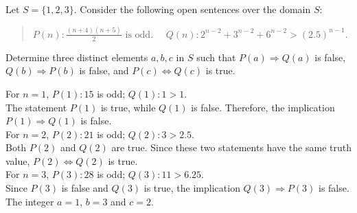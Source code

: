 \documentclass[12pt]{article}
\newenvironment{problem}[2][Problem]{\begin{trivlist}
		\item[\hskip \labelsep {\bfseries #1}\hskip \labelsep {\bfseries #2.}]}{\end{trivlist}}
\newenvironment{solution}[2][Solution]{\begin{trivlist}
		\item[\hskip \labelsep {\bfseries #1}\hskip \labelsep {\bfseries #2.}]}{\end{trivlist}}
\begin{document}
\begin{problem}{43}
	Let $S = \{1,2,3\}.$ Consider the following open sentences over the domain $S$:
	\begin{quote}
		\centering
		$P(n): \frac{(n+4)(n+5)}{2} \text{ is odd.} \quad$ 
		$Q(n): 2^{n-2} +3^{n-2} + 6^{n-2}> (2.5)^{n-1}.$
	\end{quote}
	Determine three distinct elements $a, b, c$ in $S$ such that $P(a) \Rightarrow Q(a)$ is false, $Q(b) \Rightarrow P(b)$ is false, and $P(c) \Leftrightarrow Q(c)$ is true.
	\begin{solution}{}
		For $n = 1$, $P(1):15$ is odd; $Q(1): 1 > 1.$\\
		The statement $P(1)$ is true, while $Q(1)$ is false. Therefore, the implication $P(1) \Rightarrow Q(1)$ is false.\\
		
		\noindent For $n = 2$, $P(2):21$ is odd; $Q(2): 3 > 2.5$.\\
		Both $P(2)$ and $Q(2)$ are true. Since these two statements have the same truth value, $P(2) \Leftrightarrow Q(2)$ is true.\\
		
		\noindent For $n = 3$, $P(3):28$ is odd; $Q(3):11 > 6.25$.\\
		Since $P(3)$ is false and $Q(3)$ is true, the implication $Q(3) \Rightarrow P(3)$ is false.\\
		The integer $a = 1$, $b = 3$ and $c = 2$.
	\end{solution}
\end{problem}
\end{document}
